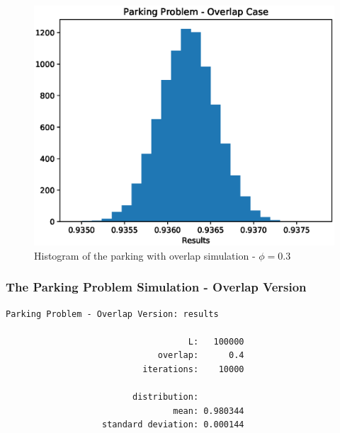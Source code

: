\documentclass{beamer}
\begin{document}
\begin{frame}
	\begin{figure}
		\centering
		\includegraphics[scale = 0.5]{parking_simulation_05.eps}
		\caption{Histogram of the parking with overlap simulation - $\phi = 0.3$}
	\end{figure}
\end{frame}

\begin{frame}[fragile]
	\frametitle{The Parking Problem Simulation - Overlap Version}
	\begin{lstlisting}[numbers=none]
    Parking Problem - Overlap Version: results

                                    L:   100000
                              overlap:      0.4
                           iterations:    10000

                         distribution:
                                 mean: 0.980344
                   standard deviation: 0.000144

	\end{lstlisting}
\end{frame}
\end{document}
